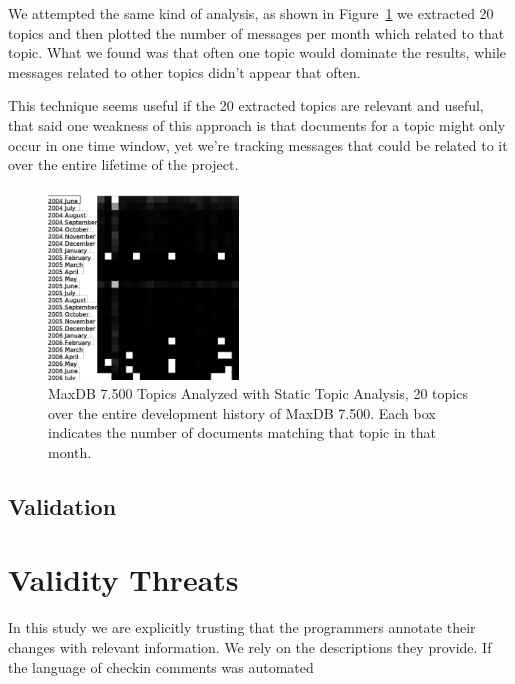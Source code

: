 \documentclass[times, 10pt,twocolumn]{article}
\begin{document}
We attempted the same kind of analysis, as shown in
Figure~\ref{fig:statictopics} we extracted 20 topics and then plotted
the number of messages per month which related to that topic. What we
found was that often one topic would dominate the results, while
messages related to other topics didn't appear that often.

This technique seems useful if the 20 extracted topics are relevant
and useful, that said one weakness of this approach is that documents
for a topic might only occur in one time window, yet we're tracking
messages that could be related to it over the entire lifetime of the
project.

\begin{figure}
  \centering
  \includegraphics[width=0.45\textwidth]{maxdb7500-everything-by-month}
  \caption{MaxDB 7.500 Topics Analyzed with Static Topic Analysis, 20
    topics over the entire development history of MaxDB 7.500. Each
    box indicates the number of documents matching that topic in that
    month.}
  \label{fig:statictopics}
\end{figure}


\subsection{Validation}


\section{Validity Threats}

In this study we are explicitly trusting that the programmers annotate
their changes with relevant information. We rely on the descriptions
they provide. If the language of checkin comments was automated
\end{document}
